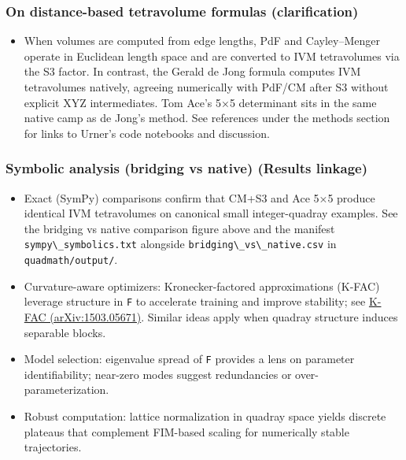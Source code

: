 \documentclass[
  10pt,
]{article}
\newcommand{\passthrough}[1]{#1}
\providecommand{\tightlist}{%
  \setlength{\itemsep}{0pt}\setlength{\parskip}{0pt}}
\begin{document}
\hypertarget{on-distance-based-tetravolume-formulas-clarification}{%
\subsubsection{On distance-based tetravolume formulas
(clarification)}\label{on-distance-based-tetravolume-formulas-clarification}}

\begin{itemize}
\tightlist
\item
  When volumes are computed from edge lengths, PdF and Cayley--Menger
  operate in Euclidean length space and are converted to IVM
  tetravolumes via the S3 factor. In contrast, the Gerald de Jong
  formula computes IVM tetravolumes natively, agreeing numerically with
  PdF/CM after S3 without explicit XYZ intermediates. Tom Ace's 5×5
  determinant sits in the same native camp as de Jong's method. See
  references under the methods section for links to Urner's code
  notebooks and discussion.
\end{itemize}

\hypertarget{symbolic-analysis-bridging-vs-native-results-linkage}{%
\subsubsection{Symbolic analysis (bridging vs native) (Results
linkage)}\label{symbolic-analysis-bridging-vs-native-results-linkage}}

\begin{itemize}
\item
  Exact (SymPy) comparisons confirm that CM+S3 and Ace 5×5 produce
  identical IVM tetravolumes on canonical small integer-quadray
  examples. See the bridging vs native comparison figure above and the
  manifest \passthrough{\lstinline!sympy\_symbolics.txt!} alongside
  \passthrough{\lstinline!bridging\_vs\_native.csv!} in
  \passthrough{\lstinline!quadmath/output/!}.
\item
  Curvature-aware optimizers: Kronecker-factored approximations (K-FAC)
  leverage structure in \passthrough{\lstinline!F!} to accelerate
  training and improve stability; see
  \href{https://arxiv.org/abs/1503.05671}{K-FAC (arXiv:1503.05671)}.
  Similar ideas apply when quadray structure induces separable blocks.
\item
  Model selection: eigenvalue spread of \passthrough{\lstinline!F!}
  provides a lens on parameter identifiability; near-zero modes suggest
  redundancies or over-parameterization.
\item
  Robust computation: lattice normalization in quadray space yields
  discrete plateaus that complement FIM-based scaling for numerically
  stable trajectories.
\end{itemize}
\end{document}
